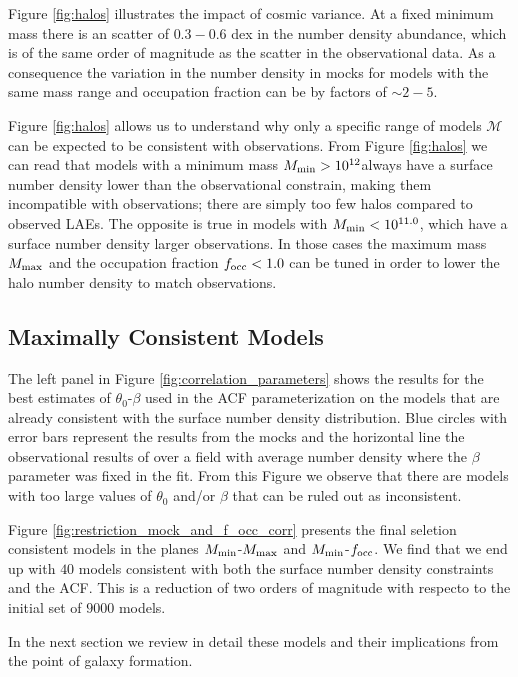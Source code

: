 \documentclass{emulateapj}
\newcommand{\hMsun}{{\ifmmode{h^{-1}{\rm
        {M_{\odot}}}}\else{$h^{-1}{\rm{M_{\odot}}}$}\fi}}
\begin{document}
Figure \ref{fig:halos} illustrates the impact of cosmic variance. At a
fixed minimum mass there is an scatter of $0.3-0.6$ dex in the number
density abundance, which is of the same order of magnitude as the
scatter in the observational data. As a consequence the variation in
the number density in mocks for models with the same mass range and
occupation fraction can be by factors of $\sim 2-5$. 

 
Figure \ref{fig:halos} allows us to understand why only a specific range of
models ${\mathcal M}$ can be expected to be consistent with
observations. From Figure \ref{fig:halos} we can read that models with
a minimum mass $M_{\rm min}>10^{12}$\hMsun always have a surface
number density lower than the observational constrain, making them
incompatible with observations; there are simply too few halos
compared to observed LAEs. The opposite is true in models with $M_{\rm
  min}<10^{11.0}$\hMsun, which have a surface number density larger
observations. In those cases the maximum mass $M_{\rm max}$ and the
occupation fraction $f_{\rm occ}<1.0$  can be tuned in order to lower
the halo number density to match observations.    

\subsection{Maximally Consistent Models}


The left panel in Figure \ref{fig:correlation_parameters} shows the
results for the best estimates of $\theta_{0}$-$\beta$  used in the
ACF parameterization on the models that are already consistent with
the surface number density distribution.  Blue circles with error bars
represent the results from the mocks and the horizontal line the
observational results of \cite{Ouchi2008} over a field with average
number density where the $\beta$ parameter was fixed in the fit. From
this Figure we observe that there are models with too large values of
$\theta_0$ and/or $\beta$ that can be ruled out as inconsistent.



Figure \ref{fig:restriction_mock_and_f_occ_corr} presents the final
seletion consistent models in the planes $M_{\rm min}$-$M_{\rm
  max}$ and $M_{\rm   min}$-$f_{\rm occ}$. We find that
we end up with $40$ models consistent with both the surface number
density constraints and the ACF.  This is a reduction of two orders of
magnitude with respecto to the initial set of $9000$ models.

In the next section we review in detail these models and their
implications from the point of galaxy formation.
\end{document}
